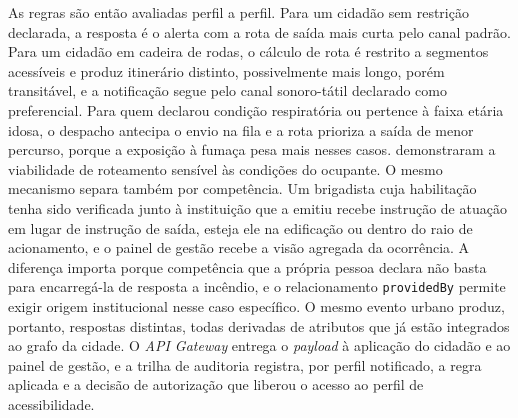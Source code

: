 As regras são então avaliadas perfil a perfil. Para um cidadão sem restrição declarada, a resposta é o alerta com a rota de saída mais curta pelo canal padrão. Para um cidadão em cadeira de rodas, o cálculo de rota é restrito a segmentos acessíveis e produz itinerário distinto, possivelmente mais longo, porém transitável, e a notificação segue pelo canal sonoro-tátil declarado como preferencial. Para quem declarou condição respiratória ou pertence à faixa etária idosa, o despacho antecipa o envio na fila e a rota prioriza a saída de menor percurso, porque a exposição à fumaça pesa mais nesses casos.  demonstraram a viabilidade de roteamento sensível às condições do ocupante. O mesmo mecanismo separa também por competência. Um brigadista cuja habilitação tenha sido verificada junto à instituição que a emitiu recebe instrução de atuação em lugar de instrução de saída, esteja ele na edificação ou dentro do raio de acionamento, e o painel de gestão recebe a visão agregada da ocorrência. A diferença importa porque competência que a própria pessoa declara não basta para encarregá-la de resposta a incêndio, e o relacionamento \texttt{providedBy} permite exigir origem institucional nesse caso específico. O mesmo evento urbano produz, portanto, respostas distintas, todas derivadas de atributos que já estão integrados ao grafo da cidade. O \textit{API Gateway} entrega o \textit{payload} à aplicação do cidadão e ao painel de gestão, e a trilha de auditoria registra, por perfil notificado, a regra aplicada e a decisão de autorização que liberou o acesso ao perfil de acessibilidade.
